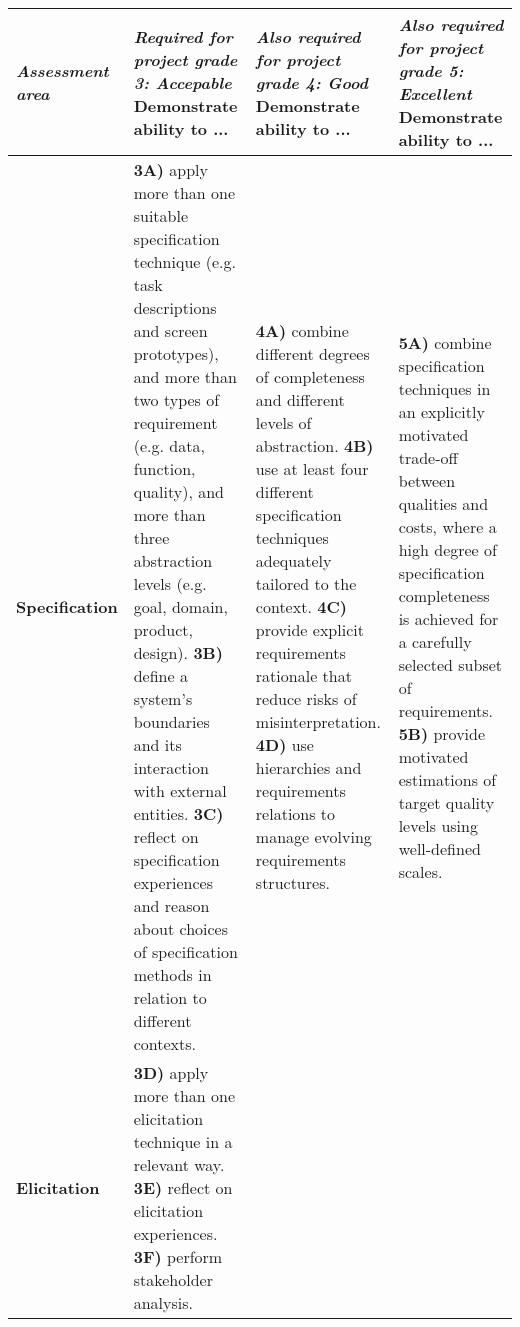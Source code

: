 \documentclass{project}
\begin{document}
\begin{adjustbox}{width=1.0\textwidth}


\begin{tabular}{| p{2.3cm} |p{6.2cm} | p{6.2cm} | p{6.2cm} |}
\hline
{\it Assessment area} & {\it Required for project grade {\bf 3: Accepable}} \newline Demonstrate ability to ... & {\it Also required for project grade {\bf 4: Good}} \newline Demonstrate ability to ...& {\it Also required for project grade {\bf 5: Excellent}} \newline Demonstrate ability to ... \\
\hline
\hline
{\bf Specification} &
    {\bf 3A)} apply more than one suitable specification technique (e.g. task descriptions and screen prototypes), and more than two types of requirement (e.g. data, function, quality), and more than three abstraction levels (e.g. goal, domain, product, design). \newline
    {\bf 3B)} define a system's boundaries and its interaction with external entities. \newline
    {\bf 3C)} reflect on specification experiences and reason about choices of specification methods in relation to different contexts. &
    {\bf 4A)} combine different degrees of completeness and different levels of abstraction. \newline
    {\bf 4B)} use at least four different specification techniques adequately tailored to the context. \newline
    {\bf 4C)} provide explicit requirements rationale that reduce risks of misinterpretation. \newline
    {\bf 4D)} use hierarchies and requirements relations to manage evolving requirements structures. &
    {\bf 5A)} combine specification techniques in an explicitly motivated trade-off between qualities and costs, where a high degree of specification completeness is achieved for a carefully selected subset of requirements.     \newline
    {\bf 5B)} provide motivated estimations of target quality levels using well-defined scales.
\\ \hline

{\bf Elicitation}  &
    {\bf 3D)} apply more than one elicitation technique in a relevant way. \newline
    {\bf 3E)} reflect on elicitation experiences. \newline 
    {\bf 3F)} perform stakeholder analysis. 
    &


\end{tabular}
\end{adjustbox}
\end{document}
